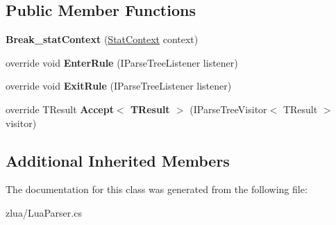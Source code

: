 \subsection*{Public Member Functions}
\begin{DoxyCompactItemize}
\item 
\mbox{\label{classzlua_1_1_lua_parser_1_1_break__stat_context_a1ec22ef954b90575779d51d2f122e4ee}} 
{\bfseries Break\+\_\+stat\+Context} (\mbox{\hyperlink{classzlua_1_1_lua_parser_1_1_stat_context}{Stat\+Context}} context)
\item 
\mbox{\label{classzlua_1_1_lua_parser_1_1_break__stat_context_a3df65294faff6a2178b386fe21355be8}} 
override void {\bfseries Enter\+Rule} (I\+Parse\+Tree\+Listener listener)
\item 
\mbox{\label{classzlua_1_1_lua_parser_1_1_break__stat_context_ae76bf7f3afc33764f3573e6560416bb0}} 
override void {\bfseries Exit\+Rule} (I\+Parse\+Tree\+Listener listener)
\item 
\mbox{\label{classzlua_1_1_lua_parser_1_1_break__stat_context_a9f8afb217e02f8ef7a4b3bf6021da125}} 
override T\+Result {\bfseries Accept$<$ T\+Result $>$} (I\+Parse\+Tree\+Visitor$<$ T\+Result $>$ visitor)
\end{DoxyCompactItemize}
\subsection*{Additional Inherited Members}


The documentation for this class was generated from the following file\+:\begin{DoxyCompactItemize}
\item 
zlua/Lua\+Parser.\+cs\end{DoxyCompactItemize}
